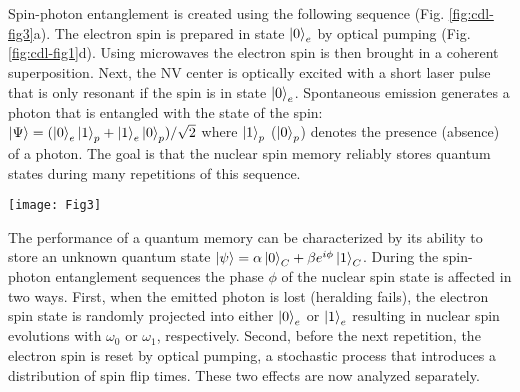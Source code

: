 Spin-photon entanglement is created using the following sequence (Fig. \ref{fig:cdl-fig3}a). The electron spin is prepared in state $\left|0\right>_e$ by optical pumping (Fig. \ref{fig:cdl-fig1}d). Using microwaves the electron spin is then brought in a coherent superposition. Next, the NV center is optically excited with a short laser pulse that is only resonant if the spin is in state $\left|0\right>_e$. Spontaneous emission generates a photon that is entangled with the state of the spin: $\left|\Psi\right> = (\left|0\right>_e \left|1\right>_p +\left|1\right>_e \left|0\right>_p)/\sqrt{2}$  where $\left|1\right>_p$ ($\left|0\right>_p$)  denotes the presence (absence) of a photon. The goal is that the nuclear spin memory reliably stores quantum states during many repetitions of this sequence.

 \begin{figure*}
	\centering
	\texttt{[image: Fig3]}
	\caption{\label{fig:cdl-fig3} \textbf{Simulations of the dephasing of a $^{13}C$ spin quantum memory while generating entanglement. } (a) Diagram for the protocol to create spin-photon entanglement. (b) Simulations of the fidelity for different $^{13}C$ spins after \textit{N} = 50 repetitions of the protocol, assuming that the reset is instantaneous ($t^{\prime}$ = 0, formula \ref{eq:CDL-deph} of main text). The initial state of a carbon spin can be perfectly preserved by choosing the time between the $\pi$/2-pulse and the reset to \textit{t} = 2$\pi$ /$d \omega$. (c) The effect of the spin pumping process on the fidelity of the memory after \textit{N} = 50 repetitions. Orange dots are a Monte-Carlo simulation where for every electron spin reset, a time $t^{\prime}$ is drawn from an exponential probability distribution with $\tau_{reset}$ = 390 ns. Grey line is a comparison with an ideal reset. $d \omega$ = (2$\pi$) 38.6 kHz. (d) Dependence of the memory fidelity on the characteristic reset time $\tau_{reset}$ using formula \ref{eq:CDL-deph_an}. (e) Dephasing of the memory as a function of entanglement attempts for different coupling strengths, fixing  $\tau_{reset}$ = 1 $\mu$s.}
\end{figure*}



The performance of a quantum memory can be characterized by its ability to store an unknown quantum state $\left|\psi\right> = \alpha \left|0\right>_C + \beta e^{i \phi}\left|1\right>_C$. During the spin-photon entanglement sequences the phase $\phi$ of the nuclear spin state is affected in two ways. First, when the emitted photon is lost (heralding fails), the electron spin state is randomly projected into either $\left|0\right>_e$ or $\left|1\right>_e$ resulting in nuclear spin evolutions with $\omega_0$ or $\omega_1$, respectively. Second, before the next repetition, the electron spin is reset by optical pumping, a stochastic process that introduces a distribution of spin flip times. These two effects are now analyzed separately.

